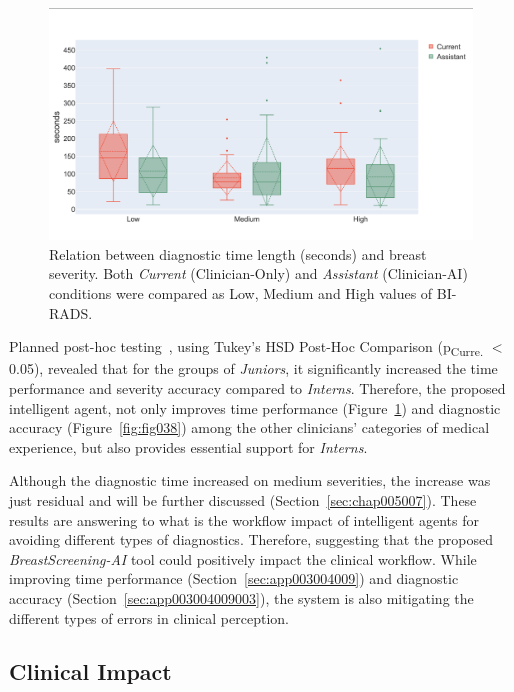 \begin{figure}[ht]
\centering
\includegraphics[width=\columnwidth]{images/fig037}
\caption{Relation between diagnostic time length (seconds) and breast severity. Both {\it Current} (Clinician-Only) and {\it Assistant} (Clinician-AI) conditions were compared as Low, Medium and High values of BI-RADS.}
\label{fig:fig037}
\end{figure}

Planned post-hoc testing~\cite{10.1145/2858036.2858360}, using Tukey's HSD Post-Hoc Comparison (p\textsubscript{Curre.} $<$ 0.05), revealed that for the groups of {\it Juniors}, it significantly increased the time performance and severity accuracy compared to {\it Interns}.
Therefore, the proposed intelligent agent, not only improves time performance (Figure~\ref{fig:fig037}) and diagnostic accuracy (Figure~\ref{fig:fig038}) among the other clinicians' categories of medical experience, but also provides essential support for {\it Interns}.

Although the diagnostic time increased on medium severities, the increase was just residual and will be further discussed (Section~\ref{sec:chap005007}).
These results are answering to what is the workflow impact of intelligent agents for avoiding different types of diagnostics.
Therefore, suggesting that the proposed {\it BreastScreening-AI} tool could positively impact the clinical workflow.
While improving time performance (Section~\ref{sec:app003004009}) and diagnostic accuracy (Section~\ref{sec:app003004009003}), the system is also mitigating the different types of errors in clinical perception.

\subsection{Clinical Impact}
\label{sec:app003004006}

